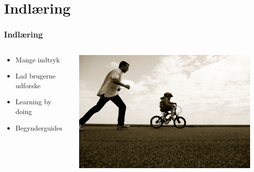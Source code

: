 \documentclass{beamer}
\begin{document}
\section{Indlæring}
\begin{frame}
\frametitle{Indlæring}
  \begin{columns}[T]
    \begin{column}{.5\textwidth}
	  \begin{itemize}
		\item Mange indtryk
		\item Lad brugerne udforske
		\item Learning by doing
		\item Begynderguides
	  \end{itemize}
    \end{column}
    \begin{column}{.4\textwidth}
      \includegraphics[width=\textwidth]{learning.jpg}
    \end{column}
  \end{columns}
\end{frame}
\end{document}
